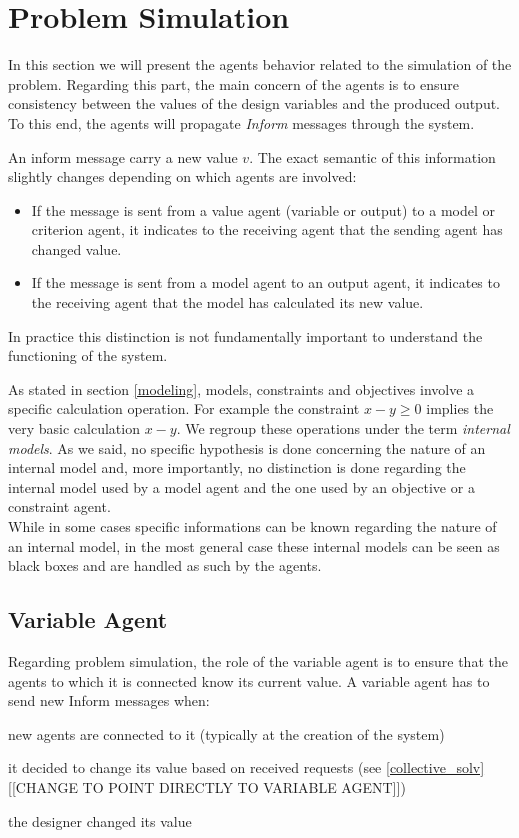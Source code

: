 \section{Problem Simulation}

In this section we will present the agents behavior related to the simulation of the problem. Regarding this part, the main concern of the agents is to ensure consistency between the values of the design variables and the produced output. To this end, the agents will propagate \emph{Inform} messages through the system.

An inform message carry a new value $v$. The exact semantic of this information slightly changes depending on which agents are involved:

\begin{itemize}
\item If the message is sent from a value agent (variable or output) to a model or criterion agent, it indicates to the receiving agent that the sending agent has changed value.

\item If the message is sent from a model agent to an output agent, it indicates to the receiving agent that the model has calculated its new value.
\end{itemize}

In practice this distinction is not fundamentally important to understand the functioning of the system.

As stated in section \ref{modeling}, models, constraints and objectives involve a specific calculation operation. For example the constraint $x -y \geq 0$ implies the very basic calculation $x - y$. We regroup these operations under the term \emph{internal models}. As we said, no specific hypothesis is done concerning the nature of an internal model and, more importantly, no distinction is done regarding the internal model used by a model agent and the one used by an objective or a constraint agent.\\
While in some cases specific informations can be known regarding the nature of an internal model, in the most general case these internal models can be seen as black boxes and are handled as such by the agents.

\subsection{Variable Agent}

Regarding problem simulation, the role of the variable agent is to ensure that the agents to which it is connected know its current value.
A variable agent has to send new Inform messages when:
\begin{compactitem}
\item new agents are connected to it (typically at the creation of the system)
\item it decided to change its value based on received requests (see \ref{collective_solv}[[CHANGE TO POINT DIRECTLY TO VARIABLE AGENT]])
\item the designer changed its value
\end{compactitem}

